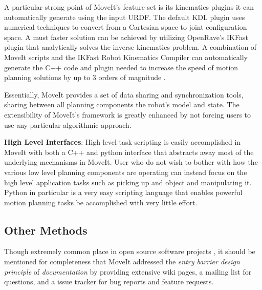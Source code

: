 \documentclass[10pt,journal,compsoc]{joser1}
\begin{document}
{A particular strong point of MoveIt's feature set is its kinematics plugins it can automatically generate using the input URDF. The default KDL plugin uses numerical techniques to convert from a Cartesian space to joint configuration space. A must faster solution can be achieved by utilizing OpenRave's IKFast \cite{ikfast} plugin that analytically solves the inverse kinematics problem. A combination of MoveIt scripts and the IKFast Robot Kinematics Compiler can automatically generate the C++ code and plugin needed to increase the speed of motion planning solutions by up to 3 orders of magnitude \cite{ikfast}.

Essentially, MoveIt provides a set of data sharing and synchronization tools, sharing between all planning components the robot's model and state. The extensibility of MoveIt's framework is greatly enhanced by not forcing users to use any particular algorithmic approach. 

{\bf High Level Interfaces}: High level task scripting is easily accomplished in MoveIt with both a C++ and python interface that abstracts away most of the underlying mechanisms in MoveIt. User who do not wish to bother with how the various low level planning components are operating can instead focus on the high level application tasks such as picking up and object and manipulating it. Python in particular is a very easy scripting language that enables powerful motion planning tasks be accomplished with very little effort.

\subsection{Other Methods}

Though extremely common place in open source software projects \cite{bruyninckx2001open}, it should be mentioned for completeness that MoveIt addressed the \textit{entry barrier design principle} of \textit{documentation} by providing extensive wiki pages, a mailing list for questions, and a issue tracker for bug reports and feature requests.

}
\end{document}
